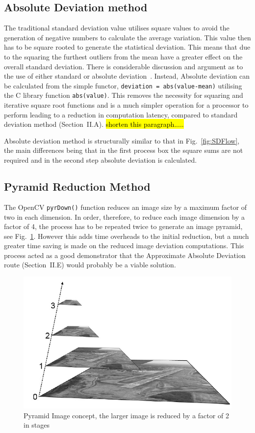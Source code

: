 \documentclass[journal]{IEEEtran}
\begin{document}
\subsection{Absolute Deviation method}
The traditional standard deviation value utilises square values to avoid the generation of negative numbers to calculate the average variation. This value then has to be square rooted to generate the statistical deviation. This means that due to the squaring the furthest outliers from the mean have a greater effect on the overall standard deviation. There is considerable discussion and argument as to the use of either standard or absolute deviation~\cite{Leys2013}. Instead, Absolute deviation can be calculated from the simple functor, \texttt{deviation = abs(value-mean)} utilising the C library function \texttt{abs(value)}. This removes the necessity for squaring and iterative square root functions and is a much simpler operation for a processor to perform leading to a reduction in computation latency, compared to standard deviation method (Section~II.A). \hl{shorten this paragraph.....} 

Absolute deviation method is structurally similar to that in Fig.~\ref{fig:SDFlow}, the main differences being that in the first process box the square sums are not required and in the second step absolute deviation is calculated. 

\subsection{Pyramid Reduction Method}
The OpenCV \texttt{pyrDown()} function reduces an image size by a maximum factor of two in each dimension. In order, therefore, to reduce each image dimension by a factor of 4, the process has to be repeated twice to generate an image pyramid, see Fig.~\ref{fig:PyrDown}. However this adds time overheads to the initial reduction, but a much greater time saving is made on the reduced image deviation computations. This process acted as a good demonstrator that the Approximate Absolute Deviation route (Section~II.E) would probably be a viable solution.
 \begin{figure}[htbp]
  \centering
    \includegraphics[width=0.8\columnwidth]{PyramidImage.jpg}
   \caption{Pyramid Image concept, the larger image is reduced by a factor of 2 in stages}
   \label{fig:PyrDown}
\end{figure}
\end{document}
